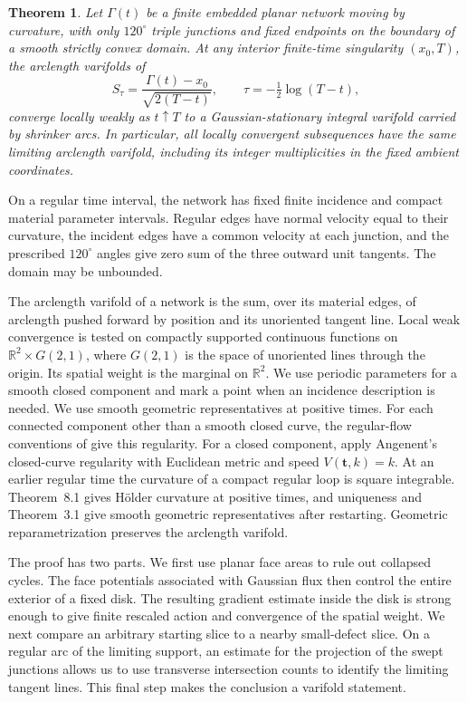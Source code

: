 \documentclass[11pt,reqno]{amsart}
\newtheorem{theorem}{Theorem}
\numberwithin{equation}{section}
\begin{document}
\begin{theorem}\label{thm:main}
Let \(\Gamma(t)\) be a finite embedded planar network moving by
curvature, with only \(120^\circ\) triple junctions and fixed endpoints
on the boundary of a smooth strictly convex domain. At any interior
finite-time singularity \((x_0,T)\), the arclength varifolds of
\begin{equation}\label{eq:rescale}
S_\tau=\frac{\Gamma(t)-x_0}{\sqrt{2(T-t)}},
\qquad \tau=-\tfrac12\log(T-t),
\end{equation}
converge locally weakly as \(t\uparrow T\) to a Gaussian-stationary
integral varifold carried by shrinker arcs. In particular, all locally
convergent subsequences have the same limiting arclength varifold,
including its integer multiplicities in the fixed ambient coordinates.
\end{theorem}

On a regular time interval, the network has fixed finite
incidence and compact material parameter intervals. Regular edges
have normal velocity equal to their curvature, the incident edges
have a common velocity at each junction, and the prescribed
\(120^\circ\) angles give zero sum of the three outward unit
tangents. The domain may be unbounded.

The arclength varifold of a network is the sum, over its material
edges, of arclength pushed forward by position and its unoriented
tangent line. Local weak convergence is tested on compactly supported
continuous functions on \(\mathbb R^2\times G(2,1)\), where \(G(2,1)\)
is the space of unoriented lines through the origin. Its spatial
weight is the marginal on \(\mathbb R^2\).
We use periodic parameters for a smooth closed component and mark a
point when an incidence description is needed.
We use smooth geometric representatives at positive times.
For each connected component other than a smooth closed curve, the regular-flow
conventions of \cite[Definitions~2.1, 2.6 and 2.11 and Theorem~5.6 of
the arXiv version]{MNPS} give this regularity. For a closed component,
apply Angenent's closed-curve regularity
\cite[Theorems~3.1 and 8.1 and their proofs]{AngCurve} with Euclidean
metric and speed \(V(\mathbf t,k)=k\). At an earlier regular time the
curvature of a compact regular loop is square integrable. Theorem~8.1
gives Hölder curvature at positive times, and uniqueness and
Theorem~3.1 give smooth geometric representatives after restarting.
Geometric reparametrization preserves the arclength varifold.

The proof has two parts. We first use planar face areas to rule out
collapsed cycles. The face potentials associated with Gaussian flux
then control the entire exterior of a fixed disk. The resulting
gradient estimate inside the disk is strong enough to give finite
rescaled action and convergence of the spatial weight. We next compare
an arbitrary starting slice to a nearby small-defect slice. On a
regular arc of the limiting support, an estimate for the projection
of the swept junctions allows us to use transverse intersection
counts to identify the limiting tangent lines. This final step makes
the conclusion a varifold statement.
\end{document}
